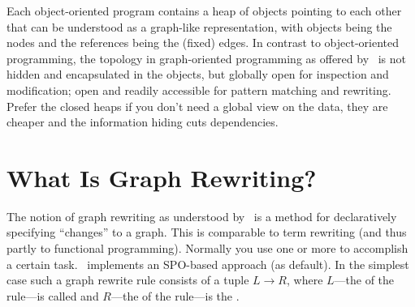 Each object-oriented program contains a heap of objects pointing to each other that can be understood as a graph-like representation, with objects being the nodes and the references being the (fixed) edges.
In contrast to object-oriented programming, the topology in graph-oriented programming as offered by \GrG\ is not hidden and encapsulated in the objects, but globally open for inspection and modification;
open and readily accessible for pattern matching and rewriting.
Prefer the closed heaps if you don't need a global view on the data, they are cheaper and the information hiding cuts dependencies.



\section{What Is Graph Rewriting?}
\label{ov:whatsallabout}

The notion of graph rewriting as understood by \GrG\ is a method for declaratively specifying ``changes'' to a graph.
This is comparable to term rewriting (and thus partly to functional programming).
Normally you use one or more  to accomplish a certain task.
\GrG\ implements an SPO-based approach (as default).
In the simplest case such a graph rewrite rule consists of a tuple $L \rightarrow R$, where $L$---the  of the rule---is called  and $R$---the  of the rule---is the .


